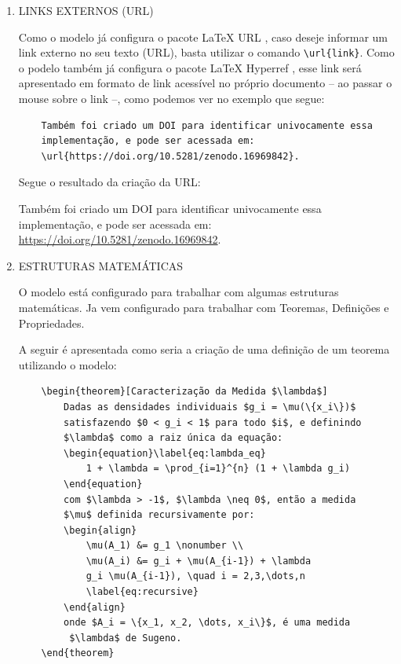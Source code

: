 \begin{enumerate}
	A sigla \hyperlink{sigla:AI}{AI}, do termo Artificial Intelligence é utilizada de forma cada vex mais corriqueira em nosso cotidiano.

	\item \MakeUppercase{Links Externos (URL)}

	Como o modelo já configura o pacote {\LaTeX} URL \cite{url_package}, caso deseje informar um link externo no seu texto (URL), basta utilizar o comando \verb|\url{link}|. Como o podelo também já configura o pacote {\LaTeX} Hyperref \cite{hyperref_package}, esse link será apresentado em formato de link acessível no próprio documento -- ao passar o mouse sobre o link --, como podemos ver no exemplo que segue:

	\begin{verbatim}
	Também foi criado um DOI para identificar univocamente essa
	implementação, e pode ser acessada em:
	\url{https://doi.org/10.5281/zenodo.16969842}.
	\end{verbatim}

	Segue o resultado da criação da URL:

	Também foi criado um DOI para identificar univocamente essa implementação, e pode ser acessada em: \url{https://doi.org/10.5281/zenodo.16969842}.

\item \MakeUppercase{Estruturas Matemáticas}

	O modelo está configurado para trabalhar com algumas estruturas matemáticas. Ja vem configurado para trabalhar com Teoremas, Definições e Propriedades.
	
	A seguir é apresentada como seria a criação de uma definição de um teorema utilizando o modelo:

	\begin{verbatim}
	\begin{theorem}[Caracterização da Medida $\lambda$]
		Dadas as densidades individuais $g_i = \mu(\{x_i\})$ 
		satisfazendo $0 < g_i < 1$ para todo $i$, e definindo 
		$\lambda$ como a raiz única da equação:
		\begin{equation}\label{eq:lambda_eq}
			1 + \lambda = \prod_{i=1}^{n} (1 + \lambda g_i)
		\end{equation}
		com $\lambda > -1$, $\lambda \neq 0$, então a medida 
		$\mu$ definida recursivamente por:
		\begin{align}
			\mu(A_1) &= g_1 \nonumber \\
			\mu(A_i) &= g_i + \mu(A_{i-1}) + \lambda 
			g_i \mu(A_{i-1}), \quad i = 2,3,\dots,n 
			\label{eq:recursive}
		\end{align}
		onde $A_i = \{x_1, x_2, \dots, x_i\}$, é uma medida
		 $\lambda$ de Sugeno.
	\end{theorem}
	\end{verbatim}
	

\end{enumerate}
